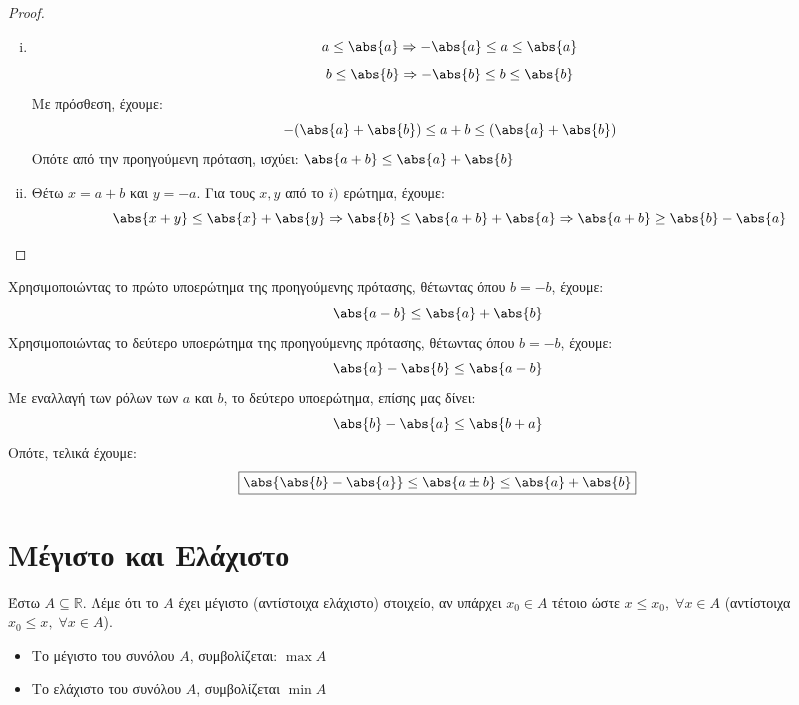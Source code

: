 \documentclass[main.tex]{subfiles}
\begin{document}
\begin{proof}
\item {}
    \begin{enumerate}[i)]
        \item \[ a \leq \abs{a} \Rightarrow - \abs{a} \leq a \leq \abs{a}
            \] 
            \[
                b \leq \abs{b} \Rightarrow - \abs{b} \leq b \leq \abs{b} 
            \] 
            Με πρόσθεση, έχουμε: 
            \[
                - (\abs{a} + \abs{b} ) \leq a + b \leq ( \abs{a} + \abs{b}) 
            \] 
            Οπότε από την προηγούμενη πρόταση, ισχύει:
            $ \abs{a+b} \leq \abs{a} + \abs{b} $
        \item Θέτω $ x = a+b $ και $ y = -a $. Για τους $ x,y $ από το $ i) $ 
            ερώτημα, έχουμε:
            \[
                \abs{x+y} \leq \abs{x} + \abs{y} \Rightarrow \abs{b} \leq 
                \abs{a+b} + \abs{a} \Rightarrow \abs{a+b} \geq \abs{b} - \abs{a}
            \] 
    \end{enumerate} 
\end{proof} 

\begin{rem}
    Χρησιμοποιώντας το πρώτο υποερώτημα της προηγούμενης πρότασης, θέτωντας
    όπου $ b = -b $, έχουμε:
    \[
        \abs{a-b} \leq \abs{a} + \abs{b} 
    \] 
    Χρησιμοποιώντας το δεύτερο υποερώτημα της προηγούμενης πρότασης, θέτωντας
    όπου $ b = -b $, έχουμε:
    \[
        \abs{a} - \abs{b} \leq \abs{a-b} 
    \]
    Με εναλλαγή των ρόλων των $ a $ και $ b $, το δεύτερο υποερώτημα, επίσης 
    μας δίνει:
    \[
        \abs{b} - \abs{a} \leq \abs{b+a} 
    \] 
    Οπότε, τελικά έχουμε:
    \[
        \boxed{\abs{\abs{b} - \abs{a}} \leq \abs{a \pm b} \leq \abs{a} + \abs{b}  }
    \]
\end{rem}

\section{Μέγιστο και Ελάχιστο}

\begin{dfn}
    Έστω $ A \subseteq \mathbb{R} $. Λέμε ότι το $A$ έχει μέγιστο 
    (αντίστοιχα ελάχιστο) στοιχείο, αν υπάρχει $ x_{0} \in A $ τέτοιο 
    ώστε $ x \leq x_{0}, \; \forall x \in A $ (αντίστοιχα $ x_{0} \leq 
    x, \; \forall x \in A$).
\end{dfn}

\begin{rem}
\item {}
    \begin{itemize}
        \item Το μέγιστο του συνόλου $A$, συμβολίζεται: $ \max A $
        \item Το ελάχιστο του συνόλου $A$, συμβολίζεται $ \min A $
    \end{itemize}
\end{rem}
\end{document}

